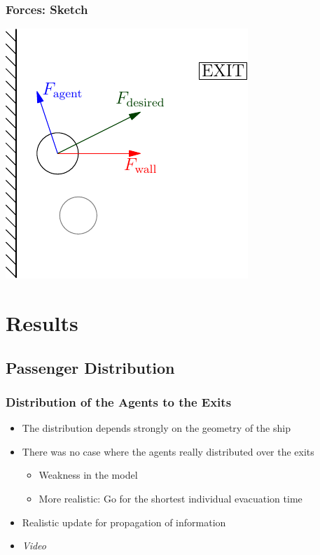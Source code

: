 \documentclass{beamer}
\begin{document}
\begin{frame}
	\frametitle{Forces: Sketch}
	\begin{center}
		\includegraphics{images/agentforces.pdf}
	\end{center}
\end{frame}



\section{Results}

\subsection{Passenger Distribution}
\begin{frame}
	\frametitle{Distribution of the Agents to the Exits}
	\begin{itemize}
		\item The distribution depends strongly on the geometry of the ship
		\item There was no case where the agents really distributed over the exits
		\begin{itemize}
			\item Weakness in the model
			\item More realistic: Go for the shortest individual evacuation time
		\end{itemize}
		\item Realistic update for propagation of information
		\item \emph{Video}
	\end{itemize}
\end{frame}
\end{document}
